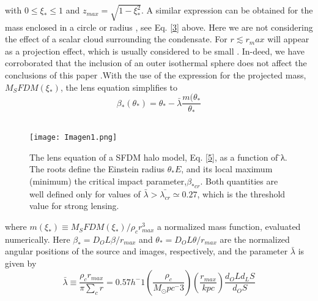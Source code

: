 \documentclass[15pt]{IEEEtran}
\begin{document}
with \(0\leq \xi_*\leq 1\) and \(z_{max}=\sqrt{1-\xi^2_*}\). A  similar expression  can  be  obtained  for  the  mass  enclosed  in  a circle  or  radius \textxi,  see  Eq. \eqref{3}  above.   Here  we  are  not considering the effect of a scalar cloud surrounding the condensate.  For \(r \lesssim r_max\) will appear as a projection effect,  which is usually considered to be small \cite{13}.  In-deed, we have corroborated that the inclusion of an outer isothermal sphere does not affect the conclusions of this paper .With the use of the expression for the projected mass,\(M_SFDM(\xi_*)\), the lens equation simplifies to
\begin{equation}\tag{5a}\label{5}
    \beta_*(\theta_*) = \theta_* - \bar{\lambda} \frac{m(\theta_*}{\theta_*}
\end{equation} \\[0.7cm]

\begin{figure}[h]
    \centering
    \texttt{[image: Imagen1.png]}
    \caption{The lens equation of a SFDM halo model, Eq. \eqref{5}, as a function of ̄λ.  The roots define the Einstein radius \(\theta_*E\), and its local maximum (minimum) the critical impact parameter,\(\beta_{*cr}\). Both quantities are well defined only for values of \(\bar{\lambda}>\bar{\lambda_{cr}}\simeq 0.27\), which is the threshold value for strong lensing.}
    \label{Fig.1.}
\end{figure}




where \(m(\xi_*) \equiv M_SFDM(\xi_*)/\rho_c r^3_{max}\) a normalized mass function, evaluated numerically. Here \(\beta_* = D_OL\beta/r_{max}\) and \(\theta_* = D_OL\theta/r_{max}\) are the  normalized  angular  positions of the source and images, respectively, and the parameter \(\bar{\lambda}\) is given by
\begin{equation}\tag{5b}\label{5b}
    \bar{\lambda}\equiv \frac{\rho_c r_{max}}{\pi \sum_cr} = 0.57h^-1(\frac{\rho_c}{M_\odot pc^-3})(\frac{r_{max}}{kpc})\frac{d_OLd_LS}{d_OS}
\end{equation}
\end{document}
